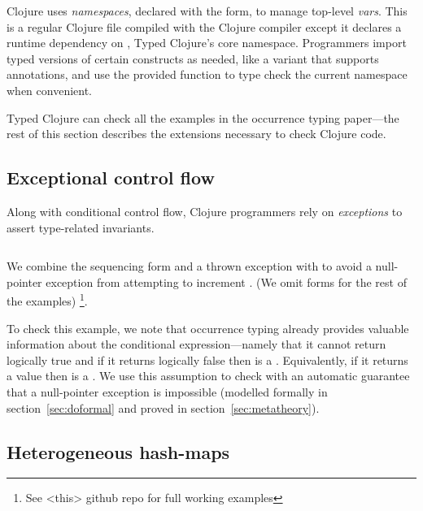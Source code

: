 \begin{exmp}
\inputminted[firstline=1]{clojure}{code/demo/src/demo/eg1.clj}
\end{exmp}

Clojure uses \emph{namespaces}, declared with the
 form, to manage top-level \emph{vars}.
This is a regular Clojure file compiled with
the Clojure compiler except it declares a runtime dependency on
, Typed Clojure's core namespace.
Programmers import typed versions of certain constructs as needed, like
a  variant that supports annotations,
and use the provided  function to type check the current namespace
when convenient.

Typed Clojure can check all the examples in the occurrence typing
paper---the rest of this section describes the extensions necessary
to check Clojure code.

\subsection{Exceptional control flow}

Along with conditional control flow,
Clojure programmers rely on \emph{exceptions}
to assert type-related invariants.

\begin{exmp}
\inputminted[firstline=13,lastline=15]{clojure}{code/demo/src/demo/do.clj}
\end{exmp}

We combine the sequencing form  and a thrown exception with
 to avoid a null-pointer exception from attempting to increment .
(We omit  forms for the rest of the examples)
\footnote{See <this> github repo for full working examples}.

To check this example, we note that
occurrence typing already provides
valuable information about the conditional expression---namely that it cannot return logically true and if it returns logically false 
then  is a . Equivalently, if it returns a value then  is a .
We use this assumption to check  with an automatic
guarantee that a null-pointer exception is impossible
(modelled formally in section~\ref{sec:doformal} and proved
in section~\ref{sec:metatheory}).

\subsection{Heterogeneous hash-maps}

